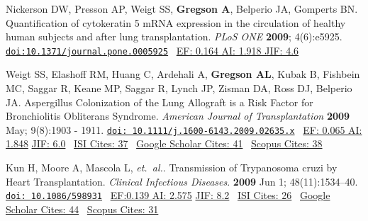 \documentclass[12pt]{moderncv} %
\begin{document}
\begin{thebibliography}{1}
 \bibitem[10]{} Nickerson DW, Presson AP, Weigt SS, \textbf{Gregson A}, Belperio JA, Gomperts BN. Quantification of cytokeratin 5 mRNA expression in the circulation of healthy human subjects and after lung transplantation. {\color{journalcolor}\textit{PLoS {\smaller ONE}}} \textbf{2009}; 4(6):e5925. \href{http://www.plosone.org/article/info%3Adoi%2F10.1371%2Fjournal.pone.0005925}{\nolinkurl{doi:10.1371/journal.pone.0005925}}~ 
     {\color{subsectioncolor} \href{http://admin-apps.isiknowledge.com/JCR/JCR?RQ=RECORD&rank=6&journal=PLOS+ONE}{{\smaller EF: 0.164 AI: 1.918 JIF: 4.6}}~ 
     }

 \bibitem[11]{} Weigt SS, Elashoff RM, Huang C, Ardehali A, \textbf{Gregson AL}, Kubak B, Fishbein MC, Saggar R, Keane MP, Saggar R,  Lynch JP, Zisman DA, Ross DJ, Belperio JA. Aspergillus Colonization of the Lung Allograft is a Risk Factor for Bronchiolitis Obliterans Syndrome. {\color{journalcolor}\textit{American Journal of Transplantation}} \textbf{2009} May; 9(8):1903 - 1911. \href{http://dx.doi.org/10.1111/j.1600-6143.2009.02635.x}{\nolinkurl{doi: 10.1111/j.1600-6143.2009.02635.x}}~ 
   {\color{subsectioncolor}\href{http://www.eigenfactor.org/detail.php?year=2006&jrlname=AM%20J%20TRANSPLANT&issnnum=1600-6135}{{\smaller EF: 0.065 AI: 1.848}} 
       \href{http://admin-apps.webofknowledge.com/JCR/JCR?RQ=RECORD&rank=1&journal=AM+J+TRANSPLANT}{{\smaller JIF: 6.0}}~
       \href{http://apps.webofknowledge.com/CitedFullRecord.do?product=WOS&colName=WOS&SID=4AG6pnd7daKF6IABJdC&search_mode=CitedFullRecord&isickref=WOS:000268050200028}{{\smaller ISI Cites: 37}}~
       \href{http://scholar.google.com/scholar?cites=2622793820022300316&as_sdt=2005&sciodt=0,5&hl=en}{{\smaller Google Scholar Cites: 41}}~
       \href{http://www.scopus.com/record/display.url?eid=2-s2.0-67650954171&origin=inward&txGid=2728424DD3A06399B3857C04F09A7B4B.N5T5nM1aaTEF8rE6yKCR3A%3a18}{{\smaller Scopus Cites: 38}}
       }

 \bibitem[12]{}Kun H, Moore A, Mascola L, \textit{et.\ al.}.  Transmission of Trypanosoma cruzi by Heart Transplantation. {\color{journalcolor}\textit{Clinical Infectious Diseases}}. \textbf{2009} Jun 1; 48(11):1534--40. \href{http:dx.doi.org/10.1086/598931}{\nolinkurl{doi: 10.1086/598931}}~
   {\color{subsectioncolor}\href{http://www.eigenfactor.org/rankings.php?search=CLINICAL+INFECTIOUS+DISEASES&search2=&search3=&searchby=journal}{{\smaller EF:0.139 AI: 2.575}}
       \href{http://admin-apps.webofknowledge.com/JCR/JCR?RQ=RECORD&rank=1&journal=CLIN+INFECT+DIS}{{\smaller JIF: 8.2}}~
       \href{http://apps.webofknowledge.com/CitedFullRecord.do?product=WOS&colName=WOS&SID=4AG6pnd7daKF6IABJdC&search_mode=CitedFullRecord&isickref=WOS:000265749400006}{{\smaller ISI Cites: 26}}~
       \href{http://scholar.google.com/scholar?cites=4422604385336448507&as_sdt=2005&sciodt=0,5&hl=en}{{\smaller Google Scholar Cites: 44}}~
       \href{http://www.scopus.com/record/display.url?eid=2-s2.0-66949151065&origin=inward&txGid=2728424DD3A06399B3857C04F09A7B4B.N5T5nM1aaTEF8rE6yKCR3A%3a37}{{\smaller Scopus Cites: 31}}
     }


\end{thebibliography}
\end{document}
